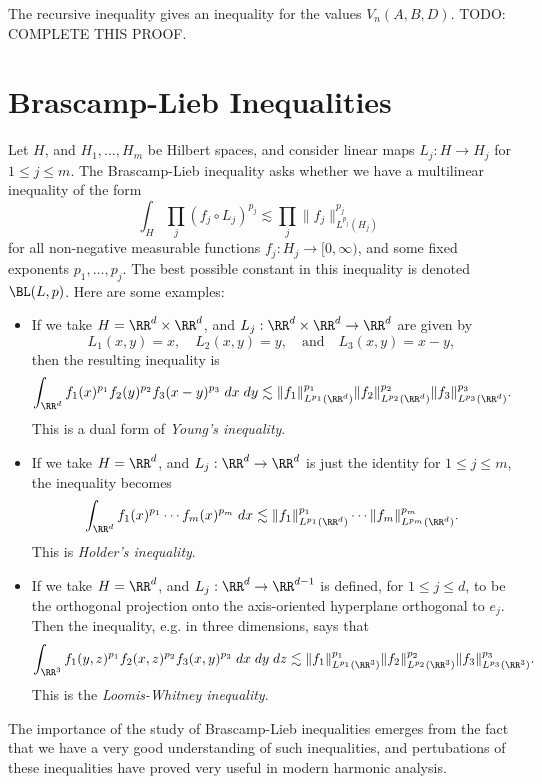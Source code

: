 The recursive inequality gives an inequality for the values $V_n(A,B,D)$. TODO: COMPLETE THIS PROOF.








\chapter{Brascamp-Lieb Inequalities}

Let $H$, and $H_1,\dots,H_m$ be Hilbert spaces, and consider linear maps $L_j: H \to H_j$ for $1 \leq j \leq m$. The Brascamp-Lieb inequality asks whether we have a multilinear inequality of the form
\[ \int_H \prod_j (f_j \circ L_j)^{p_j} \lesssim \prod_j \| f_j \|_{L^{p_j}(H_j)}^{p_j} \]
%
for all non-negative measurable functions $f_j: H_j \to [0,\infty)$, and some fixed exponents $p_1,\dots,p_j$. The best possible constant in this inequality is denoted $\BL(L,p)$. Here are some examples:
%
\begin{itemize}
    \item If we take $H = \RR^d \times \RR^d$, and $L_j: \RR^d \times \RR^d \to \RR^d$ are given by
    \[ L_1(x,y) = x, \quad L_2(x,y) = y,\quad \text{and}\quad L_3(x,y) = x - y, \]
    then the resulting inequality is
    \[ \int_{\RR^d} f_1(x)^{p_1} f_2(y)^{p_2} f_3(x - y)^{p_3}\; dx\; dy \lesssim \| f_1 \|_{L^{p_1}(\RR^d)}^{p_1} \| f_2 \|_{L^{p_2}(\RR^d)}^{p_2} \| f_3 \|_{L^{p_3}(\RR^d)}^{p_3}. \]
    This is a dual form of \emph{Young's inequality}.

    \item If we take $H = \RR^d$, and $L_j: \RR^d \to \RR^d$ is just the identity for $1 \leq j \leq m$, the inequality becomes
    \[ \int_{\RR^d} f_1(x)^{p_1} \cdots f_m(x)^{p_m}\; dx \lesssim \| f_1 \|_{L^{p_1}(\RR^d)}^{p_1} \cdots \| f_m \|_{L^{p_m}(\RR^d)}^{p_m}. \]
    This is \emph{Holder's inequality}.

    \item If we take $H = \RR^d$, and $L_j: \RR^d \to \RR^{d-1}$ is defined, for $1 \leq j \leq d$, to be the orthogonal projection onto the axis-oriented hyperplane orthogonal to $e_j$. Then the inequality, e.g. in three dimensions, says that
    \[ \int_{\RR^3} f_1(y,z)^{p_1} f_2(x,z)^{p_2} f_3(x,y)^{p_3}\; dx\; dy\; dz \lesssim \| f_1 \|_{L^{p_1}(\RR^3)}^{p_1} \| f_2 \|_{L^{p_2}(\RR^3)}^{p_2} \| f_3 \|_{L^{p_3}(\RR^3)}^{p_3}. \]
    This is the \emph{Loomis-Whitney inequality}.
\end{itemize}
%
The importance of the study of Brascamp-Lieb inequalities emerges from the fact that we have a very good understanding of such inequalities, and pertubations of these inequalities have proved very useful in modern harmonic analysis.

